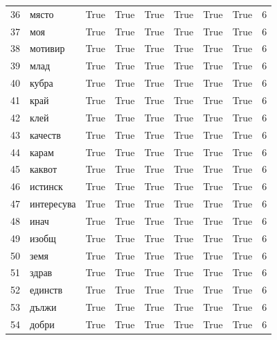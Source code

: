 \begin{longtable}{rlllllllr}
  36 &       място &     True &   True &   True &       True &           True &      True &      6 \\
  37 &         моя &     True &   True &   True &       True &           True &      True &      6 \\
  38 &     мотивир &     True &   True &   True &       True &           True &      True &      6 \\
  39 &        млад &     True &   True &   True &       True &           True &      True &      6 \\
  40 &       кубра &     True &   True &   True &       True &           True &      True &      6 \\
  41 &        край &     True &   True &   True &       True &           True &      True &      6 \\
  42 &        клей &     True &   True &   True &       True &           True &      True &      6 \\
  43 &     качеств &     True &   True &   True &       True &           True &      True &      6 \\
  44 &       карам &     True &   True &   True &       True &           True &      True &      6 \\
  45 &      каквот &     True &   True &   True &       True &           True &      True &      6 \\
  46 &     истинск &     True &   True &   True &       True &           True &      True &      6 \\
  47 &  интересува &     True &   True &   True &       True &           True &      True &      6 \\
  48 &        инач &     True &   True &   True &       True &           True &      True &      6 \\
  49 &       изобщ &     True &   True &   True &       True &           True &      True &      6 \\
  50 &        земя &     True &   True &   True &       True &           True &      True &      6 \\
  51 &       здрав &     True &   True &   True &       True &           True &      True &      6 \\
  52 &     единств &     True &   True &   True &       True &           True &      True &      6 \\
  53 &       дължи &     True &   True &   True &       True &           True &      True &      6 \\
  54 &       добри &     True &   True &   True &       True &           True &      True &      6 \\

\end{longtable}
